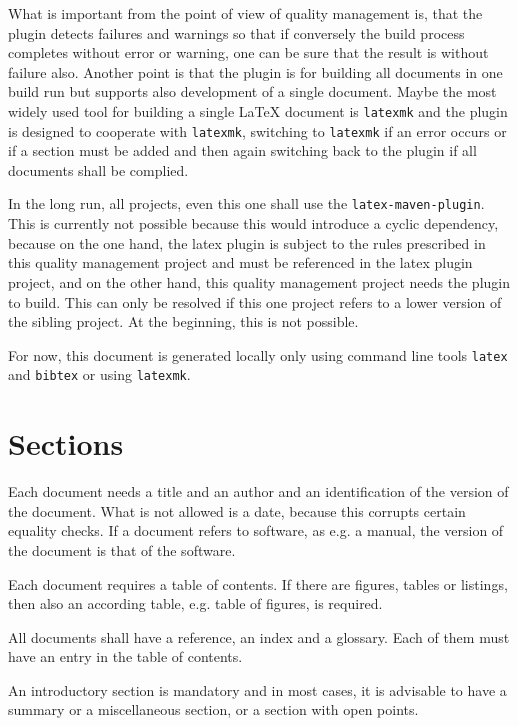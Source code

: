 \documentclass[12pt]{article}
\begin{document}
What is important from the point of view of quality management is, 
that the plugin detects failures and warnings so 
that if conversely the build process completes without error or warning, 
one can be sure that the result is without failure also. 
Another point is that the plugin is for building all documents in one build run 
but supports also development of a single document. 
Maybe the most widely used tool for building a single \LaTeX{} document 
is \texttt{latexmk} and the plugin is designed to cooperate with \texttt{latexmk}, 
switching to \texttt{latexmk} if an error occurs or if a section must be added 
and then again switching back to the plugin if all documents shall be complied. 



In the long run, 
all projects, even this one shall use the \texttt{latex-maven-plugin}. 
This is currently not possible because this would introduce a cyclic dependency, 
because on the one hand, the latex plugin is subject to the rules 
prescribed in this quality management project and must be referenced in the latex plugin project, 
and on the other hand, this quality management project needs the plugin to build. 
This can only be resolved if this one project refers to a lower version of the sibling project. 
At the beginning, this is not possible. 

For now, this document is generated locally 
only using command line tools \texttt{latex} and \texttt{bibtex} 
or using \texttt{latexmk}. 


\section{Sections}\label{sec:secs}

Each document needs a title and an author and an identification of the version of the document. 
What is not allowed is a date, because this corrupts certain equality checks. 
If a document refers to software, as e.g. a manual, 
the version of the document is that of the software. 

Each document requires a table of contents. 
If there are figures, tables or listings, then also an according table, e.g. table of figures, is required. 

All documents shall have a reference, an index and a glossary. 
Each of them must have an entry in the table of contents. 

An introductory section is mandatory and in most cases, 
it is advisable to have a summary or a miscellaneous section, 
or a section with open points. 
\end{document}
